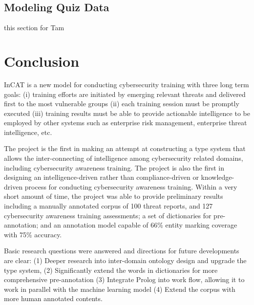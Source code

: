 \documentclass{article} %
\begin{document}
\subsection{Modeling Quiz Data}
this section for Tam

\section{Conclusion}
InCAT is a new model for conducting cybersecurity training with three long term goals: (i) training efforts are initiated by emerging relevant threats and delivered first to the most vulnerable groups (ii) each training session must be promptly executed (iii) training results must be able to provide actionable intelligence to be employed by other systems such as enterprise risk management, enterprise threat intelligence, etc.

The project is the first in making an attempt at constructing a type system that allows the inter-connecting of intelligence among cybersecurity related domains, including cybersecurity awareness training. The project is also the first in designing an intelligence-driven rather than compliance-driven or knowledge-driven process for conducting cybersecurity awareness training. Within a very short amount of time, the project was able to provide preliminary results including a manually annotated corpus of 100 threat reports, and 127 cybersecurity awareness training assessments; a set of dictionaries for pre-annotation; and an annotation model capable of 66\% entity marking coverage with 75\% accuracy.

Basic research questions were answered and directions for future developments are clear: (1) Deeper research into inter-domain ontology design and upgrade the type system, (2) Significantly extend the words in dictionaries for more comprehensive pre-annotation (3) Integrate Prolog into work flow, allowing it to work in parallel with the machine learning model (4) Extend the corpus with more human annotated contents.



\end{document}

